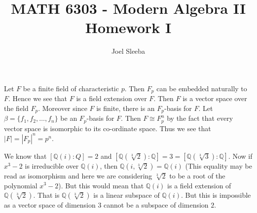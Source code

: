 \documentclass[12pt]{exam}
\theoremstyle{plain} %
\theoremstyle{definition} %
\theoremstyle{remark} %
\begin{document}
\title{MATH 6303 - Modern Algebra II \\ Homework  I}

\author{
  Joel Sleeba \\
}

\maketitle
\printanswers
\unframedsolutions

\begin{questions}

  \question
  \begin{solution}
    Let $F$ be a finite field of characteristic $p$. Then $F_p$ can
    be embedded naturally to $F$. Hence we see that $F$ is a field
    extension over $F$. Then $F$ is a vector space over the field
    $F_p$. Moreover since $F$ is finite, there is an $F_p$-basis for
    $F$. Let $\beta = \{ f_1 , f_2 , \ldots , f_n   \}$ be an
    $F_p$-basis for $F$. Then $F \cong F_p^n$ by the fact that every
    vector space is isomorphic to its co-ordinate space. Thus we see
    that $|F| = |F_p|^n = p^n$.
  \end{solution}

  \question
  \begin{solution}
    We know that $[\mathbb{Q}(i): Q] = 2$ and
    $[\mathbb{Q}(\sqrt[3]{2}):\mathbb{Q}] = 3 =
    [\mathbb{Q}(\sqrt[3]{3}): \mathbb{Q}]$. Now if $x^3 - 2$ is
    irreducible over $\mathbb{Q}(i)$, then $\mathbb{Q}(i,
    \sqrt[3]{2}) = \mathbb{Q}(i)$ (This equality may be read as
      isomorphism and here we are considering $\sqrt[3]{2}$ to be a
    root of the polynomial $x^3 - 2$). But this would mean that
    $\mathbb{Q}(i)$ is a field extension of
    $\mathbb{Q}(\sqrt[3]{2})$. That is $\mathbb{Q}(\sqrt[3]{2})$ is a
    linear subspace of $\mathbb{Q}(i)$. But this is impossible as a
    vector space of dimension $3$ cannot be a subspace of dimension $2$.
  \end{solution}


\end{questions}
\end{document}

